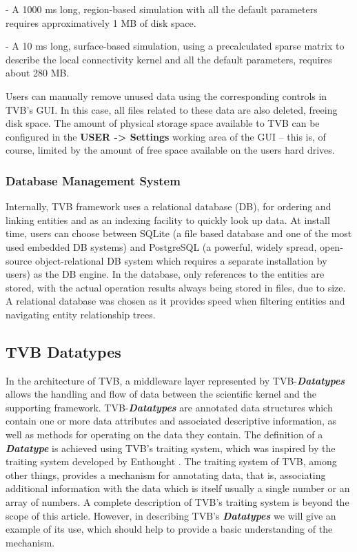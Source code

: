 \documentclass{bioinfo}
\newcommand*{\tvbdatatype}[1]{\textbf{\emph{#1}}}   %
\begin{document}
\begin{methods}
    - A 1000 ms long, region-based simulation with all the default parameters
    requires approximatively 1 MB of disk space.

    - A 10 ms long, surface-based simulation, using a precalculated sparse
    matrix to describe the local connectivity kernel and all the default
    parameters, requires about 280 MB.

    Users can manually remove unused data using the corresponding controls in
    TVB's GUI. In this case, all files related to these data are also deleted,
    freeing disk space. The amount of physical storage space available to TVB
    can be configured in the \textbf{USER -> Settings} working area of the GUI
    -- this is, of course, limited by the amount of free space available on the
    users hard drives.

    \subsubsection{Database Management System}
    Internally, TVB framework uses a relational database (DB), for ordering and 
    linking entities and as an indexing facility to quickly look up data. 
    At install time, users can choose between SQLite 
    (a file based database and one of the most used embedded DB systems) and 
    PostgreSQL (a powerful, widely spread, open-source object-relational DB 
    system which requires a separate installation by users) as the DB engine. 
    In the database, only references to the entities are stored, with the actual 
    operation results always being stored in files, due to size. A relational 
    database was chosen as it provides speed when filtering entities and 
    navigating entity relationship trees.
    
    \subsection{TVB Datatypes}\label{subsection:tvb-datatypes}    
    In the architecture of TVB, a middleware layer represented by
    TVB-\tvbdatatype{Datatypes} allows the handling and flow of data between
    the scientific kernel and the supporting framework.
    TVB-\tvbdatatype{Datatypes}  are annotated data structures which contain
    one or more data attributes and  associated descriptive information, as
    well as methods for operating on the  data they contain. The definition of
    a \tvbdatatype{Datatype} is achieved using  TVB's traiting system, which
    was inspired by the traiting system developed by  Enthought
    \citep{EnthoughtTraits}. The traiting system of TVB, among other things,
    provides a mechanism for annotating data, that is, associating additional
    information with the data which is itself usually a single number or an
    array of  numbers. A complete description of TVB's traiting system is
    beyond the  scope of this article. However, in describing TVB's
    \tvbdatatype{Datatypes} we will give an example of its use, which should
    help to provide a basic understanding of the mechanism.
      

\end{methods}
\end{document}
